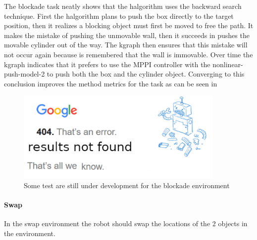The blockade task neatly shows that the \ac{halgorithm} uses the backward search technique. First the \ac{halgorithm} plans to push the box directly to the target position, then it realizes a blocking object must first be moved to free the path. It makes the mistake of pushing the unmovable wall, then it succeeds in pushes the movable cylinder out of the way. The \ac{kgraph} then ensures that this mistake will not occur again because is remembered that the wall is immovable. Over time the \ac{kgraph} indicates that it prefers to use the \ac{MPPI} controller with the nonlinear-push-model-2 to push both the box and the cylinder object. Converging to this conclusion improves the method metrics for the task as can be seen in \bs


\begin{figure}[H]
    \centering
    \includegraphics[width=0.9\textwidth]{figures/tests/404_not_found}

    \caption{Some test are still under development for the blockade environment}%
    \label{fig:results_blockade}
\end{figure}

\paragraph{Swap}
In the swap environment the robot should swap the locations of the 2 objects in the environment.\bs

